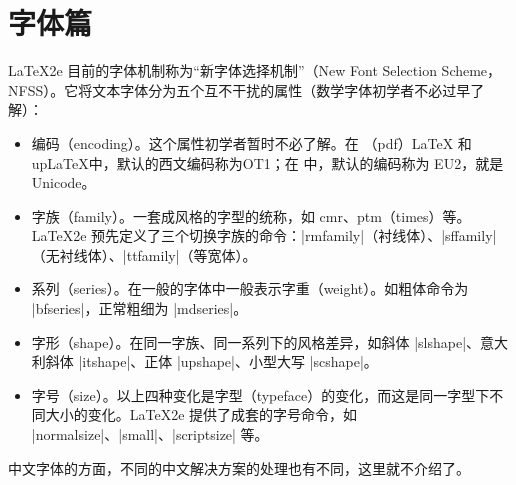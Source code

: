 %
%
%
%


\section{字体篇}


\LaTeX{2e} 目前的字体机制称为“新字体选择机制”（New Font Selection
Scheme，NFSS）。它将文本字体分为五个互不干扰的属性（数学字体初学者不必过早了解）：
\begin{itemize}
  \item 编码（encoding）。这个属性初学者暂时不必了解。在 （pdf）\LaTeX{} 和 up\LaTeX 中，默认的西文编码称为OT1；在 \XeLaTeX 中，默认的编码称为 EU2，就是 Unicode。
  \item 字族（family）。一套成风格的字型的统称，如 cmr、ptm（times）等。\LaTeX2e{} 预先定义了三个切换字族的命令：|rmfamily|（衬线体）、|sffamily|（无衬线体）、|ttfamily|（等宽体）。
  \item 系列（series）。在一般的字体中一般表示字重（weight）。如粗体命令为 |bfseries|，正常粗细为 |mdseries|。
  \item 字形（shape）。在同一字族、同一系列下的风格差异，如斜体 |slshape|、意大利斜体 |itshape|、正体 |upshape|、小型大写 |scshape|。
  \item 字号（size）。以上四种变化是字型（typeface）的变化，而这是同一字型下不同大小的变化。\LaTeX2e{} 提供了成套的字号命令，如 |normalsize|、|small|、|scriptsize| 等。
\end{itemize}

中文字体的方面，不同的中文解决方案的处理也有不同，这里就不介绍了。




